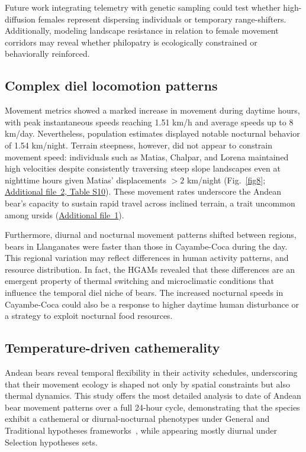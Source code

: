 \documentclass[lineno,referee,pdflatex,sn-vancouver-num]{sn-jnl}%
\theoremstyle{thmstyleone}%
\theoremstyle{thmstyletwo}%
\theoremstyle{thmstylethree}%
\begin{document}
Future work integrating telemetry with genetic sampling could test whether
high-diffusion females represent dispersing individuals or temporary
range-shifters.
Additionally, modeling landscape resistance in relation to female movement corridors may
reveal whether philopatry is ecologically constrained or behaviorally reinforced.

\subsection{Complex diel locomotion patterns}

Movement metrics showed a marked increase in movement during daytime hours, with peak
instantaneous speeds reaching 1.51 km/h and average speeds up to 8 km/day. Nevertheless,
population estimates displayed notable nocturnal behavior of 1.54 km/night. Terrain steepness, however, did not appear to constrain movement speed: individuals such as Matias, Chalpar, and Lorena maintained high velocities despite consistently traversing steep slope landscapes even at nighttime hours given Matias' displacements $>2$ km/night (Fig.~\ref{fig8}; \hyperref[S2_File]{Additional file~2, Table S10}).
These movement rates underscore the Andean bear's capacity to sustain rapid travel across inclined terrain, a trait uncommon among ursids (\hyperref[S1_File]{Additional file~1}).

Furthermore, diurnal and nocturnal movement patterns shifted between regions, bears in Llanganates were faster than those in Cayambe-Coca during the day. This regional variation may reflect differences in human activity patterns, and resource distribution. In fact, the HGAMs revealed that these differences are an emergent property of thermal switching and microclimatic conditions that influence the temporal diel niche of bears. The increased nocturnal speeds in Cayambe-Coca could also be a response to higher daytime human disturbance or a strategy to exploit nocturnal food resources.

\subsection{Temperature-driven cathemerality}

Andean bears reveal temporal flexibility in their activity schedules, underscoring that their movement ecology is shaped not only by spatial constraints but also thermal dynamics.
This study offers the most detailed analysis to date of Andean bear movement patterns over a full 24-hour cycle, demonstrating that the species exhibit a cathemeral or diurnal-nocturnal phenotypes under General and Traditional hypotheses frameworks~\cite{gerberModelbasedHypothesisFramework2024}, while appearing mostly diurnal under Selection hypotheses sets.
\end{document}
